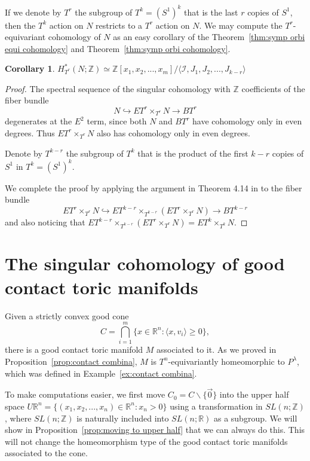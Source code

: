 \documentclass[12pt]{amsart}
\newtheorem{corollary}[theorem]{Corollary}
\theoremstyle{definition}
\numberwithin{equation}{section}
\begin{document}
If we denote by $T^r$ the subgroup of $T^k=(S^1)^k$ that is the last
$r$ copies of $S^1$, then the $T^k$ action on $N$ restricts to a
$T^r$ action on $N$. We may compute the $T^r$-equivariant cohomology
of $N$ as an easy corollary of the Theorem~\ref{thm:symp orbi equi
cohomology} and Theorem~\ref{thm:symp orbi cohomology}.

\begin{corollary}
$H_{T^r}^{*}(N;{{\mathbb{Z}}})\simeq {{\mathbb{Z}}}[x_{1},x_{2},...,x_{m}]/\langle{{\mathcal{I}}},
J_{1},J_{2},...,J_{k-r}\rangle$
\end{corollary}
\begin{proof}
The spectral sequence of the singular cohomology with ${{\mathbb{Z}}}$
coefficients of the fiber bundle
\begin{equation*}
N\hookrightarrow ET^r\times_{T^r}N\rightarrow BT^r
\end{equation*}
degenerates at the $E^{2}$ term, since both $N$ and $BT^r$ have
cohomology only in even degrees. Thus $ET^r\times_{T^r} N$ also has
cohomology only in even degrees.

Denote by $T^{k-r}$ the subgroup of $T^k$ that is the product of the
first $k-r$ copies of $S^1$ in $T^k= (S^1)^k$.

We complete the proof by applying the argument in Theorem 4.14 in
\cite{DJ} to the fiber bundle
\begin{equation*}
ET^r\times_{T^r}N \hookrightarrow
ET^{k-r}\times_{T^{k-r}}(ET^r\times_{T^r}N)\rightarrow BT^{k-r}
\end{equation*}
and also noticing that
$ET^{k-r}\times_{T^{k-r}}(ET^r\times_{T^r}N)=ET^k\times_{T^k}N$.
\end{proof}

\section{\bf The singular cohomology of good contact toric manifolds}\label{sec:cohomology contact}
Given a strictly convex good cone
\begin{equation}
 C= \bigcap_{i=1}^{m}\{x\in {{\mathbb{R}}}^n: \langle x, v_{i}\rangle \geq 0\},
\end{equation}
there is a good contact toric manifold $M$ associated to it. As we
proved in Proposition~\ref{prop:contact combina}, $M$ is
$T^n$-equivariantly homeomorphic to $P^{\lambda}$, which was defined
in Example~\ref{ex:contact combina}.

To make computations easier, we first move
$C_{0}=C\backslash\{\vec{0}\}$ into the upper half space $U{{\mathbb{R}}}^n=
\{(x_{1},x_{2},...,x_{n})\in {{\mathbb{R}}}^n:x_{n}>0\}$ using a transformation
in $SL(n;{{\mathbb{Z}}})$, where $SL(n;{{\mathbb{Z}}})$ is naturally included into
$SL(n;{{\mathbb{R}}})$ as a subgroup. We will show in
Proposition~\ref{prop:moving to upper half} that we can always do
this. This will not change the homeomorphism type of the good
contact toric manifolds associated to the cone.
\end{document}
